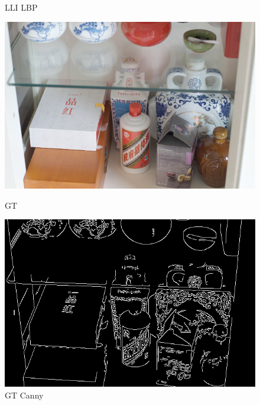 \documentclass[CJK,aspectratio=169]{beamer}  %
\begin{document}
\begin{frame}
\begin{figure}
\begin{minipage}{.19\textwidth}
				\caption*{\tiny LLI LBP}
				\label{fig: LLI_lbp}	
			\end{minipage}
			\begin{minipage}{.19\textwidth}
				\centering
				\includegraphics[width=\linewidth]{picture/LLIE/My Architecture/Edge Detection/normal00044}
				\caption*{\tiny GT}
				\label{fig: GI}
			\end{minipage}
			\begin{minipage}{.19\textwidth}
				\centering
				\includegraphics[width=\linewidth]{picture/LLIE/My Architecture/Edge Detection/normal00044_canny}
				\caption*{\tiny GT Canny}
				\label{fig: GT_canny}	
			\end{minipage}
			\begin{minipage}{.19\textwidth}
				\centering

\end{minipage}
\end{figure}
\end{frame}
\end{document}
